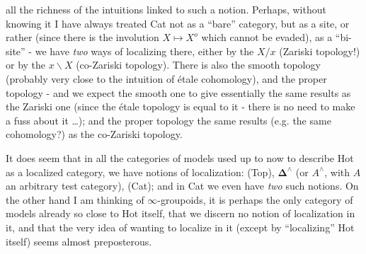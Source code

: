 all the richness of the intuitions linked to such a notion. Perhaps, without knowing it I have always treated Cat not as a ``bare'' category, but as a site, or rather (since there
is the involution $X \longmapsto X^{o}$ which cannot be evaded), as a ``bi-site'' - we have \textit{two} ways of localizing there, either by the $X/x$ (Zariski topology!) or by the $x\backslash X$ (co-Zariski topology). There is also the smooth topology (probably very close to the intuition of étale cohomology), and the proper topology - and we expect the smooth one to give essentially the same results as the Zariski one (since the étale topology is equal to it - there is no need to make a fuss about it \dots); and the proper topology the same results (e.g. the same cohomology?) as the co-Zariski topology. %

It does seem that in all the categories of models used up to now to describe Hot as a localized category, we have notions of localization: (Top), $\mathbf{\Delta}^\wedge$ (or $A^\wedge$, with $A$ an arbitrary test category), (Cat); and in Cat we even have \textit{two} such notions. On the other hand I am thinking of $\infty$-groupoids, it is perhaps the only category of models already so close to Hot itself, that we discern no notion of localization in it, and that the very idea of wanting to localize in it (except by ``localizing'' Hot itself) seems almost
preposterous.

